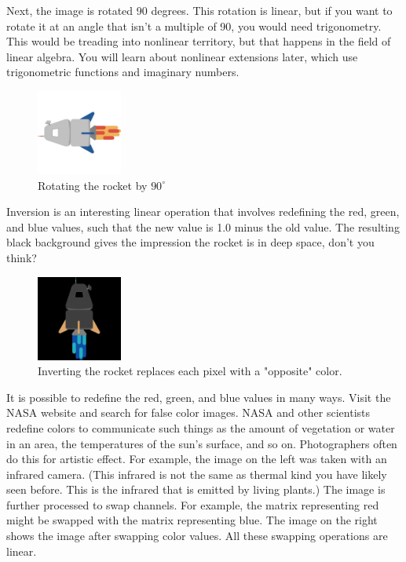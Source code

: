 Next, the image is rotated 90 degrees. This rotation is linear, but if you 
want to rotate it at an angle that isn't a multiple of 90, you would need 
trigonometry. This would be treading into nonlinear territory, but that happens 
in the field of linear algebra. You will learn about nonlinear extensions 
later, which use trigonometric functions and imaginary numbers.

\begin{figure}[htbp]
    \centering
    \includegraphics[width=0.25\textwidth]{rocket-rotated-90.png}
    \caption{Rotating the rocket by $90^\circ$}
    \label{fig:rocket-rotated}
\end{figure}

Inversion is an interesting linear operation that involves redefining the red, 
green, and blue values, such that the new value is 1.0 minus the old value. 
The resulting black background gives the impression the rocket is in deep 
space, don't you think?

\begin{figure}[htbp]
    \centering
    \includegraphics[width=0.25\textwidth]{rocket-inverted.png}
    \caption{Inverting the rocket replaces each pixel with a "opposite" color.}
    \label{fig:rocket-inverted}
\end{figure}

It is possible to redefine the red, green, and blue values in many ways. Visit 
the NASA website and search for false color images. NASA and other scientists 
redefine colors to communicate such things as the amount of vegetation or 
water in an area, the temperatures of the sun's surface, and so on. 
Photographers often do this for artistic effect. For example, the image on the 
left was taken with an infrared camera. (This infrared is not the same as 
thermal kind you have likely seen before. This is the infrared that is emitted 
by living plants.) The image is further processed to swap channels. For 
example, the matrix representing red might be swapped with the matrix 
representing blue. The image on the right shows the image after swapping color 
values. All these swapping operations are linear.

